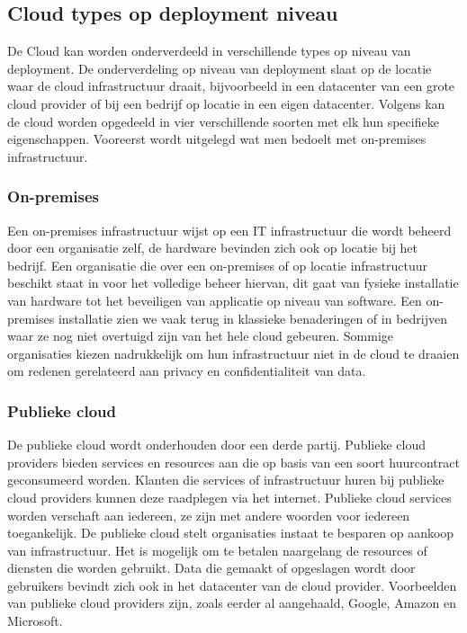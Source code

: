 \subsection{Cloud types op deployment niveau}
\label{cloud-deployment-level}
De Cloud kan worden onderverdeeld in verschillende types op niveau van deployment. De onderverdeling op niveau van deployment slaat op de locatie waar de cloud infrastructuur draait, bijvoorbeeld in een datacenter van een grote cloud provider of bij een bedrijf op locatie in een eigen datacenter. Volgens \textcite{Goyal2014} kan de cloud worden opgedeeld in vier verschillende soorten met elk hun specifieke eigenschappen. Vooreerst wordt uitgelegd wat men bedoelt met on-premises infrastructuur.

\subsubsection{On-premises}
Een on-premises infrastructuur wijst op een IT infrastructuur die wordt beheerd door een organisatie zelf, de hardware bevinden zich ook op locatie bij het bedrijf. Een organisatie die over een on-premises of op locatie infrastructuur beschikt staat in voor het volledige beheer hiervan, dit gaat van fysieke installatie van hardware tot het beveiligen van applicatie op niveau van software. Een on-premises installatie zien we vaak terug in klassieke benaderingen of in bedrijven waar ze nog niet overtuigd zijn van het hele cloud gebeuren. Sommige organisaties kiezen nadrukkelijk om hun infrastructuur niet in de cloud te draaien om redenen gerelateerd aan privacy en confidentialiteit van data. \autocite{Goyal2014}

\subsubsection{Publieke cloud}
De publieke cloud wordt onderhouden door een derde partij. Publieke cloud providers bieden services en resources aan die op basis van een soort huurcontract geconsumeerd worden. Klanten die services of infrastructuur huren bij publieke cloud providers kunnen deze raadplegen via het internet. Publieke cloud services worden verschaft aan iedereen, ze zijn met andere woorden voor iedereen toegankelijk. De publieke cloud stelt organisaties instaat te besparen op aankoop van infrastructuur. Het is mogelijk om te betalen naargelang de resources of diensten die worden gebruikt. Data die gemaakt of opgeslagen wordt door gebruikers bevindt zich ook in het datacenter van de cloud provider. Voorbeelden van publieke cloud providers zijn, zoals eerder al aangehaald, Google, Amazon en Microsoft. \autocite{Goyal2014}

